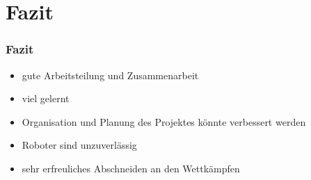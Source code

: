 \section{Fazit}

\begin{frame}
\frametitle{Fazit}

\begin{itemize}
	\item gute Arbeitsteilung und Zusammenarbeit
	\item viel gelernt
	\item Organisation und Planung des Projektes könnte verbessert werden
	\item Roboter sind unzuverlässig
	\item sehr erfreuliches Abschneiden an den Wettkämpfen
\end{itemize}
\end{frame}   